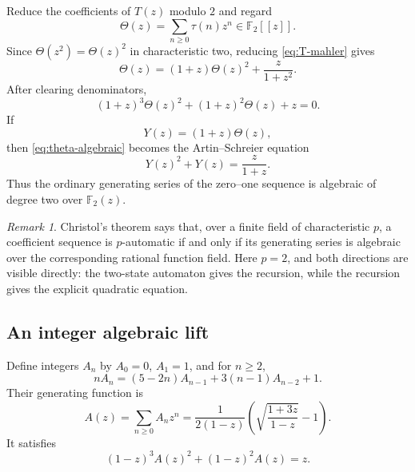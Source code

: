 \documentclass[11pt,oneside]{article}
\theoremstyle{definition}
\theoremstyle{remark}
\newtheorem{remark}[theorem]{Remark}
\newcommand{\Ftwo}{\mathbb F_2}
\begin{document}
Reduce the coefficients of $T(z)$ modulo $2$ and regard
\[
 \Theta(z)=\sum_{n\ge0}\tau(n)z^n\in\Ftwo[[z]].
\]
Since $\Theta(z^2)=\Theta(z)^2$ in characteristic two, reducing
\cref{eq:T-mahler} gives
\begin{equation}\label{eq:theta-mod2-mahler}
 \Theta(z)=(1+z)\Theta(z)^2+\frac{z}{1+z^2}.
\end{equation}
After clearing denominators,
\begin{equation}\label{eq:theta-algebraic}
 \boxed{\quad
 (1+z)^3\Theta(z)^2+(1+z)^2\Theta(z)+z=0.
 \quad}
\end{equation}
If
\begin{equation}\label{eq:Y-definition}
 Y(z)=(1+z)\Theta(z),
\end{equation}
then \cref{eq:theta-algebraic} becomes the Artin--Schreier equation
\begin{equation}\label{eq:Artin-Schreier}
 \boxed{\qquad Y(z)^2+Y(z)=\frac{z}{1+z}.\qquad}
\end{equation}
Thus the ordinary generating series of the zero--one sequence is algebraic of
degree two over $\Ftwo(z)$.

\begin{remark}
Christol's theorem says that, over a finite field of characteristic $p$, a
coefficient sequence is $p$-automatic if and only if its generating series is
algebraic over the corresponding rational function field.  Here $p=2$, and
both directions are visible directly: the two-state automaton gives the
recursion, while the recursion gives the explicit quadratic equation.
\end{remark}

\subsection{An integer algebraic lift}

Define integers $A_n$ by $A_0=0$, $A_1=1$, and for $n\ge2$,
\begin{equation}\label{eq:integer-lift-recurrence}
 nA_n=(5-2n)A_{n-1}+3(n-1)A_{n-2}+1.
\end{equation}
Their generating function is
\begin{equation}\label{eq:integer-lift-generating}
 A(z)=\sum_{n\ge0}A_nz^n
 =\frac1{2(1-z)}
  \left(\sqrt{\frac{1+3z}{1-z}}-1\right).
\end{equation}
It satisfies
\begin{equation}\label{eq:integer-lift-algebraic}
 \boxed{\qquad
 (1-z)^3A(z)^2+(1-z)^2A(z)=z.
 \qquad}
\end{equation}
\end{document}
